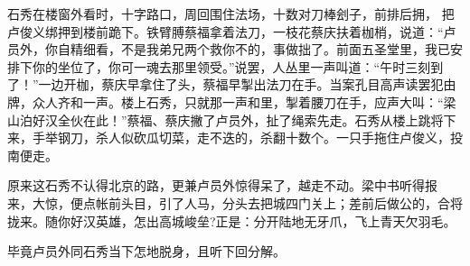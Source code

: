 石秀在楼窗外看时，十字路口，周回围住法场，十数对刀棒刽子，前排后拥，
把卢俊义绑押到楼前跪下。铁臂膊蔡福拿着法刀，一枝花蔡庆扶着枷梢，说道：“卢
员外，你自精细看，不是我弟兄两个救你不的，事做拙了。前面五圣堂里，我已安
排下你的坐位了，你可一魂去那里领受。”说罢，人丛里一声叫道：“午时三刻到
了！”一边开枷，蔡庆早拿住了头，蔡福早掣出法刀在手。当案孔目高声读罢犯由
牌，众人齐和一声。楼上石秀，只就那一声和里，掣着腰刀在手，应声大叫：“梁
山泊好汉全伙在此！”蔡福、蔡庆撇了卢员外，扯了绳索先走。石秀从楼上跳将下
来，手举钢刀，杀人似砍瓜切菜，走不迭的，杀翻十数个。一只手拖住卢俊义，投
南便走。

原来这石秀不认得北京的路，更兼卢员外惊得呆了，越走不动。梁中书听得报
来，大惊，便点帐前头目，引了人马，分头去把城四门关上；差前后做公的，合将
拢来。随你好汉英雄，怎出高城峻垒?正是：分开陆地无牙爪，飞上青天欠羽毛。

毕竟卢员外同石秀当下怎地脱身，且听下回分解。